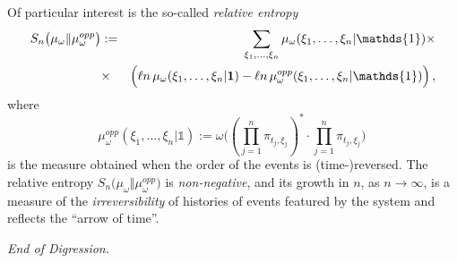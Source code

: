 \documentclass[12pt]{article}
\begin{document}
Of particular interest is the so-called \textit{relative entropy} 
\begin{eqnarray}\label{relentropy}
S_{n}\big(\mu_{\omega} \Vert \mu_{\omega}^{opp}\big)&:= &\sum_{\xi_1, \dots, \xi_{n}} \mu_{\omega}(\xi_1, \dots, \xi_{n}\vert {\mathds{1}}) \times \nonumber \\
&\times& \Big(\ell n  \,\mu_{\omega}(\xi_1, \dots, \xi_{n}\vert {\bf{1}}) - \ell n \, \mu_{\omega}^{opp}(\xi_1, \dots, \xi_{n}\vert {\mathds{1}}) \Big)\,,
\end{eqnarray}
where
$$\mu_{\omega}^{opp}(\xi_1, \dots, \xi_n \vert {\mathds{1}}) := \omega\Big((\prod_{j=1}^{n} \pi_{t_j, \xi_j})^{*}\cdot \prod_{j=1}^{n}\pi_{t_j, \xi_j}\Big)\,$$
is the measure obtained when the order of the events is (time-)reversed. The relative entropy $S_{n}\big(\mu_{\omega} \Vert \mu_{\omega}^{opp}\big)$ is \textit{non-negative}, and its growth in $n$, as $n \rightarrow \infty$, is a measure of the \textit{irreversibility} of histories of events featured by the system and reflects the ``arrow of time''.

 \textit{End of Digression.}
\end{document}
